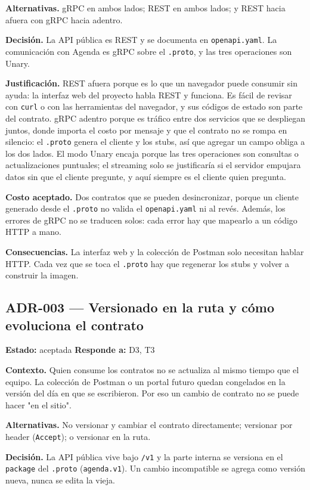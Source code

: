 \documentclass[12pt, a4paper]{article}
\begin{document}
\textbf{Alternativas.} gRPC en ambos lados; REST en ambos lados; y REST
hacia afuera con gRPC hacia adentro.

\textbf{Decisión.} La API pública es REST y se documenta en
\texttt{openapi.yaml}. La comunicación con Agenda es gRPC sobre el
\texttt{.proto}, y las tres operaciones son Unary.

\textbf{Justificación.} REST afuera porque es lo que un navegador puede
consumir sin ayuda: la interfaz web del proyecto habla REST y funciona. Es
fácil de revisar con \texttt{curl} o con las herramientas del navegador, y
sus códigos de estado son parte del contrato. gRPC adentro porque es
tráfico entre dos servicios que se despliegan juntos, donde importa el
costo por mensaje y que el contrato no se rompa en silencio: el
\texttt{.proto} genera el cliente y los stubs, así que agregar un campo
obliga a los dos lados. El modo Unary encaja porque las tres operaciones
son consultas o actualizaciones puntuales; el streaming solo se
justificaría si el servidor empujara datos sin que el cliente pregunte, y
aquí siempre es el cliente quien pregunta.

\textbf{Costo aceptado.} Dos contratos que se pueden desincronizar, porque
un cliente generado desde el \texttt{.proto} no valida el
\texttt{openapi.yaml} ni al revés. Además, los errores de gRPC no se
traducen solos: cada error hay que mapearlo a un código HTTP a mano.

\textbf{Consecuencias.} La interfaz web y la colección de Postman solo
necesitan hablar HTTP. Cada vez que se toca el \texttt{.proto} hay que
regenerar los stubs y volver a construir la imagen.

\subsection{ADR-003 \texorpdfstring{---}{---} Versionado en la ruta y cómo evoluciona el contrato}

\textbf{Estado:} aceptada \hfill \textbf{Responde a:} D3, T3

\textbf{Contexto.} Quien consume los contratos no se actualiza al mismo
tiempo que el equipo. La colección de Postman o un portal futuro quedan
congelados en la versión del día en que se escribieron. Por eso un cambio
de contrato no se puede hacer "en el sitio".

\textbf{Alternativas.} No versionar y cambiar el contrato directamente;
versionar por header (\texttt{Accept}); o versionar en la ruta.

\textbf{Decisión.} La API pública vive bajo \texttt{/v1} y la parte interna
se versiona en el \texttt{package} del \texttt{.proto}
(\texttt{agenda.v1}). Un cambio incompatible se agrega como versión nueva,
nunca se edita la vieja.
\end{document}

